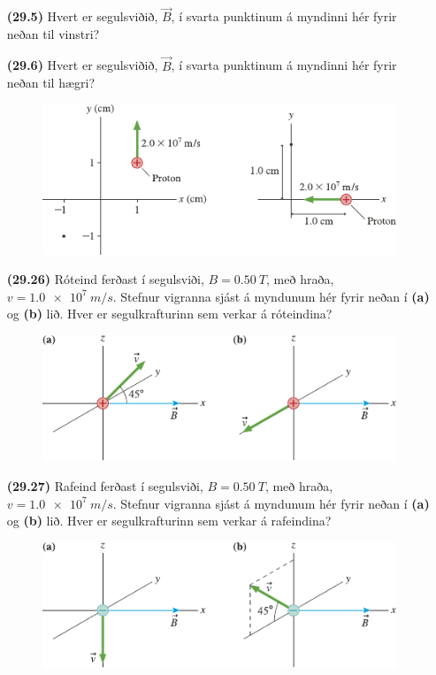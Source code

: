 \begin{enumerate}[label = \textbf{(\alph*)}]

\item[\textbf{(29.5)}] Hvert er segulsviðið, $\vec{B}$, í svarta punktinum á myndinni hér fyrir neðan til vinstri?

\item[\textbf{(29.6)}] Hvert er segulsviðið, $\vec{B}$, í svarta punktinum á myndinni hér fyrir neðan til hægri?

\begin{figure}[H]
    \centering
    \includegraphics{figures/rk2904.pdf}
\end{figure}

\item[\textbf{(29.26)}] Róteind ferðast í segulsviði, $B = \SI{0.50}{T}$, með hraða, $v = \SI{1.0e7}{m/s}$. Stefnur vigranna sjást á myndunum hér fyrir neðan í \textbf{(a)} og \textbf{(b)} lið. Hver er segulkrafturinn sem verkar á róteindina?

\begin{figure}[H]
    \centering
    \includegraphics{figures/rk2927.pdf}
\end{figure}

\item[\textbf{(29.27)}] Rafeind ferðast í segulsviði, $B = \SI{0.50}{T}$, með hraða, $v = \SI{1.0e7}{m/s}$. Stefnur vigranna sjást á myndunum hér fyrir neðan í \textbf{(a)} og \textbf{(b)} lið. Hver er segulkrafturinn sem verkar á rafeindina?

\begin{figure}[H]
    \centering
    \includegraphics{figures/rk2926.pdf}
\end{figure}


\end{enumerate}
